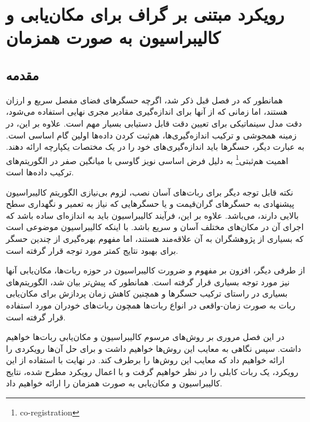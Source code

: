 
\chapter{رویکرد مبتنی بر گراف برای مکان‌یابی و کالیبراسیون به صورت همزمان}

\section{مقدمه}
همانطور که در فصل قبل ذکر شد، اگرچه حسگرهای فضای مفصل سریع و ارزان هستند، اما زمانی که از آنها برای اندازه‌گیری مقادیر مجری نهایی استفاده می‌شود، دقت مدل سینماتیکی برای تعیین دقت قابل دستیابی بسیار مهم است. علاوه بر این، در زمینه همجوشی و ترکیب اندازه‌گیری‌ها، هم‌ثبت کردن داده‌ها
\cite{hall1997introduction} 
 اولین گام اساسی است. به عبارت دیگر، حسگرها باید اندازه‌گیری‌های خود را در یک مختصات یکپارچه ارائه دهند. اهمیت هم‌ثبتی\footnote{co-registration}
  به دلیل فرض اساسی نویز گاوسی با میانگین صفر در الگوریتم‌های ترکیب داده‌ها است.
 
 نکته قابل توجه دیگر برای ربات‌های آسان نصب، لزوم بی‌نیازی الگوریتم کالیبراسیون پیشنهادی به حسگرهای گران‌قیمت و یا حسگرهایی که نیاز به تعمیر و نگهداری سطح بالایی دارند، می‌باشد. علاوه بر این، فرآیند کالیبراسیون باید به اندازه‌ای ساده باشد که اجرای آن در مکان‌های مختلف آسان و سریع باشد. با اینکه کالیبراسیون موضوعی است که بسیاری از پژوهشگران به آن علاقه‌مند هستند، اما مفهوم بهره‌گیری از چندین حسگر برای بهبود نتایج کمتر مورد توجه قرار گرفته است.
 

از طرفی دیگر، افزون بر مفهوم و ضرورت کالیبراسیون در حوزه ربات‌ها، مکان‌یابی آنها نیز مورد توجه بسیاری قرار گرفته است. همانطور که پیش‌تر بیان شد، الگوریتم‌های بسیاری در راستای ترکیب حسگرها و همچنین کاهش زمان پردازش برای مکان‌یابی ربات به صورت زمان-واقعی در انواع ربات‌ها همچون ربات‌های خودران مورد استفاده قرار گرفته است.

در این فصل مروری بر روش‌های مرسوم کالیبراسیون و مکان‌یابی ربات‌ها خواهیم داشت. سپس نگاهی به معایب این روش‌ها خواهیم داشت و برای حل آن‌ها رویکردی را ارائه خواهیم داد که معایب این روش‌ها را برطرف کند. در نهایت با استفاده از این رویکرد، یک ربات کابلی را در نظر خواهیم گرفت و با اعمال رویکرد مطرح شده، نتایج کالیبراسیون و مکان‌یابی به صورت همزمان را ارائه خواهیم داد.

